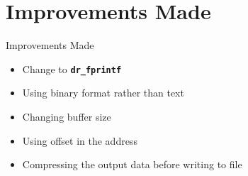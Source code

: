 \documentclass[aspectratio=169]{beamer}
\begin{document}
\section{Improvements Made}
\begin{frame}{Improvements Made}
    \begin{itemize}
        \item Change to \textbf{\texttt{dr\_fprintf}}
        \item Using binary format rather than text
        \item Changing buffer size
        \item Using offset in the address
        \item Compressing the output data before writing to file
    \end{itemize}
\end{frame}
\end{document}
